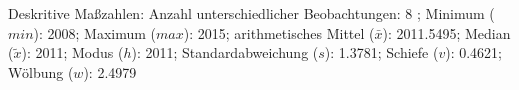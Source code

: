 				\label{tableValues:bocc242b_v1}
				\vspace*{-\baselineskip}
                    \begin{noten}
                	    \note{} Deskritive Maßzahlen:
                	    Anzahl unterschiedlicher Beobachtungen: 8%
                	    ; 
                	      Minimum ($min$): 2008; 
                	      Maximum ($max$): 2015; 
                	      arithmetisches Mittel ($\bar{x}$): \num[round-mode=places,round-precision=2]{2011,5495}; 
                	      Median ($\tilde{x}$): 2011; 
                	      Modus ($h$): 2011; 
                	      Standardabweichung ($s$): \num[round-mode=places,round-precision=2]{1,3781}; 
                	      Schiefe ($v$): \num[round-mode=places,round-precision=2]{0,4621}; 
                	      Wölbung ($w$): \num[round-mode=places,round-precision=2]{2,4979}
                     \end{noten}


